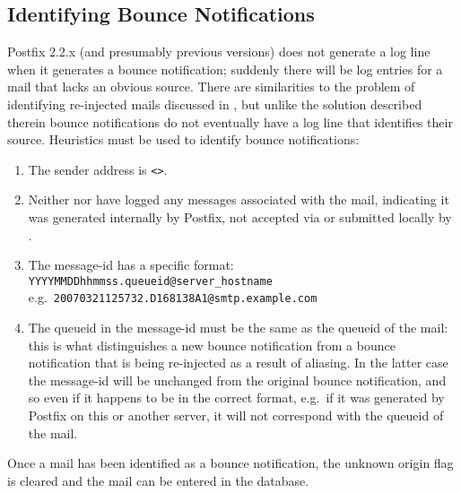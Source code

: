 \subsection{Identifying Bounce Notifications}

\label{identifying bounce notifications}

Postfix 2.2.x (and presumably previous versions) does not generate a log
line when it generates a bounce notification; suddenly there will be log
entries for a mail that lacks an obvious source.  There are similarities to
the problem of identifying re-injected mails discussed in
, but unlike the solution described
therein bounce notifications do not eventually have a log line that
identifies their source.  Heuristics must be used to identify bounce
notifications:

\begin{enumerate}

    \item The sender address is \verb!<>!.\glsadd{<>}

    \item Neither  nor  have logged any
        messages associated with the mail, indicating it was generated
        internally by Postfix, not accepted via  or submitted
        locally by .

    \item The message-id has a specific format: \newline{}
        \tab{} \texttt{YYYYMMDDhhmmss.queueid@server\_hostname} \newline{}
        e.g.\ \texttt{20070321125732.D168138A1@smtp.example.com}

    \item The queueid in the message-id must be the same as the queueid of
        the mail: this is what distinguishes a new bounce notification from
        a bounce notification that is being re-injected as a result of
        aliasing.  In the latter case the message-id will be unchanged from
        the original bounce notification, and so even if it happens to be
        in the correct format, e.g.\ if it was generated by Postfix on this
        or another server, it will not correspond with the queueid of the
        mail.

\end{enumerate}

Once a mail has been identified as a bounce notification, the unknown
origin flag is cleared and the mail can be entered in the database.

